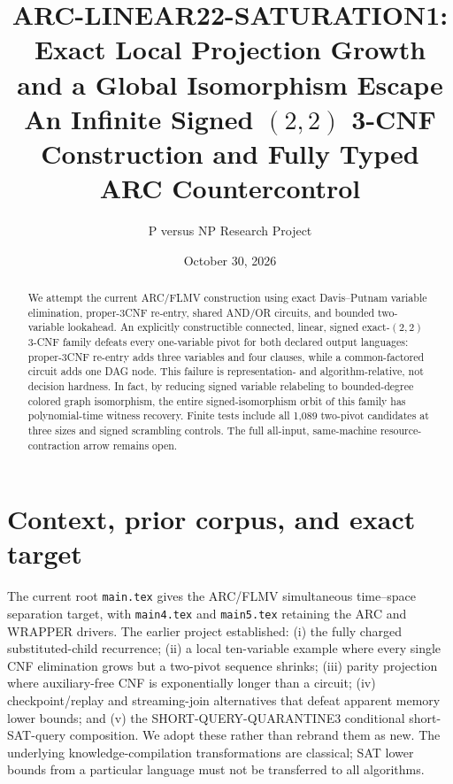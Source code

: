 \documentclass[11pt]{article}
\title{ARC-LINEAR22-SATURATION1: Exact Local Projection Growth\\[.2em]and a Global Isomorphism Escape\\[.35em]
\large An Infinite Signed $(2,2)$ 3-CNF Construction and Fully Typed ARC Countercontrol}
\author{P versus NP Research Project}
\date{October 30, 2026}
\begin{document}
\maketitle
\begin{center}
\end{center}

\begin{abstract}
We attempt the current ARC/FLMV construction using exact Davis--Putnam variable elimination,
proper-3CNF re-entry, shared AND/OR circuits, and bounded two-variable lookahead. An explicitly
constructible connected, linear, signed exact-$(2,2)$ 3-CNF family defeats every one-variable
pivot for both declared output languages: proper-3CNF re-entry adds three variables and four
clauses, while a common-factored circuit adds one DAG node. This failure is representation-
and algorithm-relative, not decision hardness. In fact, by reducing signed variable relabeling
to bounded-degree colored graph isomorphism, the entire signed-isomorphism orbit of this
family has polynomial-time witness recovery. Finite tests include all 1,089 two-pivot
candidates at three sizes and signed scrambling controls. The full all-input, same-machine
resource-contraction arrow remains open.
\end{abstract}

\section{Context, prior corpus, and exact target}
The current root \texttt{main.tex} gives the ARC/FLMV simultaneous time--space
separation target, with \texttt{main4.tex} and \texttt{main5.tex} retaining the ARC
and WRAPPER drivers. The earlier project established: (i) the fully charged
substituted-child recurrence; (ii) a local ten-variable example where every
single CNF elimination grows but a two-pivot sequence shrinks; (iii) parity
projection where auxiliary-free CNF is exponentially longer than a circuit;
(iv) checkpoint/replay and streaming-join alternatives that defeat apparent
memory lower bounds; and (v) the SHORT-QUERY-QUARANTINE3 conditional short-SAT-query
composition. We adopt these rather than rebrand them as new. The underlying
knowledge-compilation transformations are classical\cite{dechter,dm}; SAT
lower bounds from a particular language must not be transferred to all algorithms.
\end{document}
